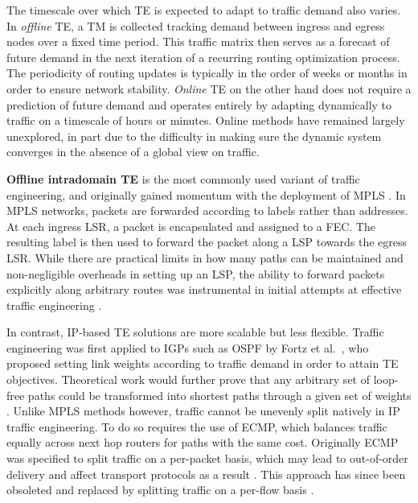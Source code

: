 The timescale over which \ac{TE} is expected to adapt to traffic demand also varies.
In \emph{offline} \ac{TE}, a \ac{TM} is collected tracking demand between ingress and egress nodes over a fixed time period.
This traffic matrix then serves as a forecast of future demand in the next iteration of a recurring routing optimization process.
The periodicity of routing updates is typically in the order of weeks or months in order to ensure network stability.
\emph{Online} \ac{TE} on the other hand does not require a prediction of future demand and operates entirely by adapting dynamically to traffic on a timescale of hours or minutes.
Online methods have remained largely unexplored, in part due to the difficulty in making sure the dynamic system converges in the absence of a global view on traffic.

\textbf{Offline intradomain \ac{TE}} is the most commonly used variant of traffic engineering, and originally gained momentum with the deployment of \ac{MPLS} \cite{Rosen:2001p147}.
In \ac{MPLS} networks, packets are forwarded according to labels rather than addresses. 
At each ingress \ac{LSR}, a packet is encapsulated and assigned to a \ac{FEC}.
The resulting label is then used to forward the packet along a \ac{LSP} towards the egress \ac{LSR}.
While there are practical limits in how many paths can be maintained and non-negligible overheads in setting up an \ac{LSP}, the ability to forward packets explicitly along arbitrary routes was instrumental in initial attempts at effective traffic engineering \cite{Xiao:2000p502,YufeiWang:1999p222}.

In contrast, IP-based \ac{TE} solutions are more scalable but less flexible.
Traffic engineering was first applied to \acp{IGP} such as \ac{OSPF} by Fortz et al.\ \cite{Fortz:2000p350,Fortz:2002p179}, who proposed setting link weights according to traffic demand in order to attain \ac{TE} objectives.
Theoretical work would further prove that any arbitrary set of loop-free paths could be transformed into shortest paths through a given set of weights \cite{Wang:2001p506}.
Unlike \ac{MPLS} methods however, traffic cannot be unevenly split natively in IP traffic engineering.
To do so requires the use of \ac{ECMP}, which balances traffic equally across next hop routers for paths with the same cost.
Originally \ac{ECMP} was specified to split traffic on a per-packet basis, which may lead to out-of-order delivery and affect transport protocols as a result \cite{Thaler:2000p154}.
This approach has since been obsoleted and replaced by splitting traffic on a per-flow basis \cite{Feldmann:2000p503}.

